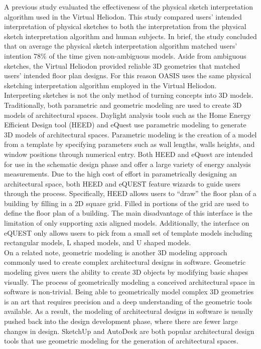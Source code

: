 	A previous study evaluated the effectiveness of the physical sketch interpretation algorithm used in the Virtual Heliodon\cite{cutler2009inferring}.
	This study compared users' intended interpretation of physical sketches to both the
	interpretation from the physical sketch interpretation algorithm and human subjects.
	In brief, the study concluded that on average the physical sketch interpretation algorithm matched users' intention 78\% of the time given non-ambiguous models\cite{cutler2009inferring}.
	Aside from ambiguous sketches, the Virtual Heliodon provided reliable 3D geometries that matched users' intended floor plan designs.
	For this reason OASIS uses the same physical sketching interpretation algorithm employed in the Virtual Heliodon.\\

	Interpreting sketches is not the only method of turning concepts into 3D models.
	Traditionally, both parametric and geometric modeling are used to create 3D models of architectural spaces.
	Daylight analysis tools such as the Home Energy Efficient Design tool (HEED) and eQuest use parametric modeling to generate 3D models of architectural spaces\cite{hirsch2010equest,milne2001drag}.
	Parametric modeling is the creation of a model from a template by specifying parameters such as wall lengths, walls heights, and window positions through numerical entry.
	Both HEED and eQuest are intended for use in the schematic design phase and offer a large variety of energy analysis measurements.
	Due to the high cost of effort in parametrically designing an architectural space, both HEED and eQUEST feature wizards to guide users through the process. 
	Specifically, HEED allows users to ``draw'' the floor plan of a building by filling in a 2D square grid. Filled in portions of the grid are used to define the floor plan of a building. The main disadvantage of this interface is the limitation of only supporting axis aligned models. 
	Additionally, the interface on eQUEST only allows users to pick from a small set of template models including rectangular models, L shaped models, and U shaped models.\\

	On a related note, geometric modeling is another 3D modeling approach commonly used to create complex architectural designs in software.
	Geometric modeling gives users the ability to create 3D objects by modifying basic shapes visually.
	The process of geometrically modeling a conceived architectural space in software is non-trivial.
	Being able to geometrically model complex 3D geometries is an art that requires precision and a deep understanding of the geometric tools available.
	As a result, the modeling of architectural designs in software is usually pushed back into the design development phase, where there are fewer large changes in design\cite{Galasiu}.
	SketchUp and AutoDesk are both popular architectural design tools that use geometric modeling for the generation of architectural spaces\cite{sketchup,autodesk}. \\

